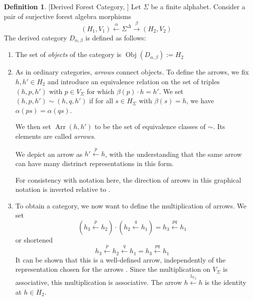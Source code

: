 \documentclass[sigplan,9pt]{acmart}\settopmatter{printfolios=true,printccs=false,printacmref=false}
\newcounter{thm}
\newcounter{theorem}
\theoremstyle{definition}
\newtheorem{defin}[thm]{Definition}
\newcommand{\carrow}[3]{#3 \xleftarrow{#2} #1 }
\newcommand{\Arr}[0]{{\operatorname{Arr}}}
\newcommand{\Obj}[0]{{\operatorname{Obj}}}
\begin{document}
\begin{defin}\label{def:derived-category}[Derived Forest Category, \cite{straubing-forest-2018}]
Let $\Sigma$ be a finite alphabet. Consider a pair of surjective forest algebra morphisms
$$(H_1, V_1) \xleftarrow{\alpha} \Sigma^\Delta \xrightarrow{\beta} (H_2, V_2)$$
The derived category $D_{\alpha,\beta}$ is defined as follows:
\begin{enumerate}
\item The set of \emph{objects} of the category is $\Obj(D_{\alpha,\beta}) := H_2$
\item As in ordinary categories, \emph{arrows} connect objects.
To define the arrows, we fix $h, h' \in H_2$ and introduce an equivalence relation on the set of triples $(h,p,h')$ with $p \in V_\Sigma$ for which $\beta(p)\cdot h=h'$. We set $(h,p,h')\sim(h,q,h')$ if for all $s\in H_ \Sigma$ with $\beta(s)=h$, we have $\alpha(ps) = \alpha(qs)$.

We then set $\Arr(h,h')$ to be the set of equivalence classes of $\sim$.
Its elements are called \emph{arrows}.

We depict an arrow as $\carrow{h}{p}{h'}$, with the understanding that the same arrow can have many distrinct representations in this form.

For consistency with notation here, the direction of arrows in this graphical notation is inverted relative to \cite{straubing-forest-2018}.


\item To obtain a category, we now want to define the multiplication of arrows. We set
$$\left( \carrow{h_2}{p}{h_3}\right)\cdot\left(\carrow{h_1}{q}{h_2}\right)=\carrow{h_1}{pq}{h_3}$$
or shortened
$$\carrow{\carrow{h_1}{q}{h_2}}{p}{h_3}=\carrow{h_1}{pq}{h_3}$$
It can be shown that this is a well-defined arrow, independently of the representation chosen for the arrows \cite{straubing-forest-2018}.
Since the multiplication on $V_\Sigma$ is associative, this multiplication is associative.
The arrow $\carrow{h}{1_{V_\Sigma}}{h}$ is the identity at $h\in H_2$.



\end{enumerate}
\end{defin}
\end{document}
